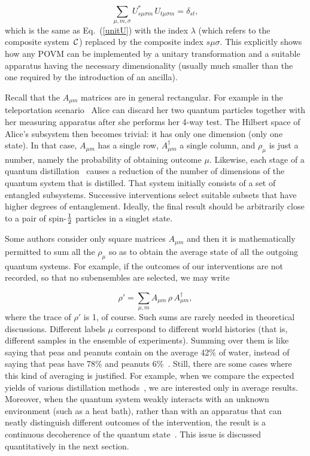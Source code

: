 \documentclass[12pt]{article}
\def\beq{\begin{equation}}
\def\eeq{\end{equation}}
\def\Eq{Eq.~(\ref}
\def\cC{$\cal C$}
\begin{document}
\beq \sum_{\mu,m,\sigma}
  U_{s\mu\sigma m}^*\,U_{t\mu\sigma m}=\delta_{st},\eeq
which is the same as \Eq{unitU}) with the index $\lambda$ (which refers
to the composite system~\cC) replaced by the composite index
$s\mu\sigma$. This explicitly shows how any POVM can be implemented by a
unitary transformation and a suitable apparatus having the necessary
dimensionality (usually much smaller than the one required by the
introduction of an ancilla).

Recall that the $A_{\mu m}$ matrices are in general rectangular. For
example in the teleportation scenario~\cite{telep} Alice can discard her
two quantum particles together with her measuring apparatus after she
performs her 4-way test. The Hilbert space of Alice's subsystem then
becomes trivial: it has only one dimension (only one state). In that
case, $A_{\mu m}$ has a single row, $A_{\mu m}^\dagger$ a single column,
and $\rho_\mu$ is just a number, namely the probability of obtaining
outcome $\mu$. Likewise, each stage of a quantum
distillation~\cite{distil1,distil2} causes a reduction of the number of
dimensions of the quantum system that is distilled. That system
initially consists of a set of entangled subsystems. Successive
interventions select suitable subsets that have higher degrees of
entanglement. Ideally, the final result should be arbitrarily close to a
pair of spin-$1\over2$ particles in a singlet state.

Some authors consider only square matrices $A_{\mu m}$ and then it is
mathematically permitted to sum all the $\rho_\mu$ so as to obtain the
average state of all the outgoing quantum systems. For example, if the
outcomes of our interventions are not recorded, so that no subensembles
are selected, we may write

\beq  \rho'=\sum_{\mu,m} A_{\mu m}\,\rho\,A_{\mu m}^\dagger,
  \label{noselect} \eeq
where the trace of $\rho'$ is 1, of course. Such sums are rarely needed
in theoretical discussions. Different labels $\mu$ correspond to
different world histories (that is, different samples in the ensemble of
experiments). Summing over them is like saying that peas and peanuts
contain on the average 42\% of water, instead of saying that peas have
78\% and peanuts 6\%~\cite{USDA}. Still, there are some cases where this
kind of averaging is justified. For example, when we compare the
expected yields of various distillation methods~\cite{distil1,distil2},
we are interested only in average results. Moreover, when the quantum
system weakly interacts with an unknown environment (such as a heat
bath), rather than with an apparatus that can neatly distinguish
different outcomes of the intervention, the result is a continuous
decoherence of the quantum state~\cite{Zurek}. This issue is discussed
quantitatively in the next section.
\end{document}
